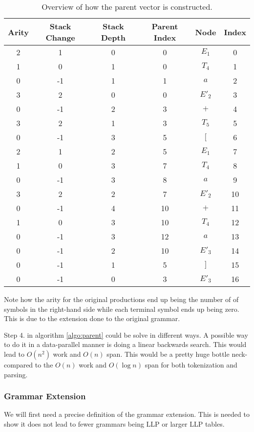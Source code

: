 \documentclass[a4paper,12pt]{article}
\theoremstyle{definition}
\begin{document}
\begin{table}[H]
  \centering
  \begin{tabular}{c|c|c|c|c|c}
    Arity & Stack Change & Stack Depth & Parent Index & Node & Index \\ \hline
    2 & 1  & 0 & 0  & $E_1$  & 0  \\ \hline
    1 & 0  & 1 & 0  & $T_4$  & 1  \\ \hline
    0 & -1 & 1 & 1  & $a$    & 2  \\ \hline
    3 & 2  & 0 & 0  & $E'_2$ & 3  \\ \hline
    0 & -1 & 2 & 3  & $+$    & 4  \\ \hline
    3 & 2  & 1 & 3  & $T_5$  & 5  \\ \hline
    0 & -1 & 3 & 5  & $[$    & 6  \\ \hline
    2 & 1  & 2 & 5  & $E_1$  & 7  \\ \hline
    1 & 0  & 3 & 7  & $T_4$  & 8  \\ \hline
    0 & -1 & 3 & 8  & $a$    & 9  \\ \hline
    3 & 2  & 2 & 7  & $E'_2$ & 10 \\ \hline
    0 & -1 & 4 & 10 & $+$    & 11 \\ \hline
    1 & 0  & 3 & 10 & $T_4$  & 12 \\ \hline
    0 & -1 & 3 & 12 & $a$    & 13 \\ \hline
    0 & -1 & 2 & 10 & $E'_3$ & 14 \\ \hline
    0 & -1 & 1 & 5  & $]$    & 15 \\ \hline
    0 & -1 & 0 & 3  & $E'_3$ & 16
  \end{tabular}
  \caption{Overview of how the parent vector is constructed.}
\end{table}
Note how the arity for the original productions end up being the number of of symbols in the right-hand side while each terminal symbol ends up being zero. This is due to the extension done to the original grammar.

Step 4. in algorithm \ref{algo:parent} could be solve in different ways. A possible way to do it in a data-parallel manner is doing a linear backwards search. This would lead to $O(n^2)$ work and $O(n)$ span. This would be a pretty huge bottle neck-compared to the $O(n)$ work and $O(\log n)$ span for both tokenization and parsing.

\subsubsection{Grammar Extension}
We will first need a precise definition of the grammar extension. This is needed to show it does not lead to fewer grammars being LLP or larger LLP tables. 
\end{document}
